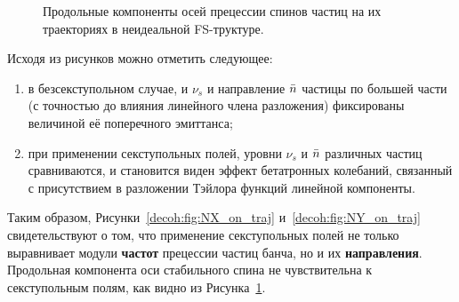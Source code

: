\begin{figure}[!h]
	\centering
	\hfill
	\hfill
	\caption{Продольные компоненты осей прецессии спинов частиц на их траекториях в неидеальной FS-труктуре.\label{decoh:fig:NZ_on_traj}}
\end{figure}

Исходя из рисунков можно отметить следующее:
\begin{enumerate}
	\item в безсекступольном случае, и $\nu_s$ и направление $\bar n$ частицы по большей части (с точностью до влияния линейного члена разложения) фиксированы величиной её поперечного эмиттанса;
	\item при применении секступольных полей, уровни $\nu_s$ и $\bar n$ различных частиц сравниваются, 
	и становится виден эффект бетатронных колебаний, связанный с присутствием в разложении Тэйлора функций линейной компоненты.
\end{enumerate}
Таким образом, Рисунки~\ref{decoh:fig:NX_on_traj} и~\ref{decoh:fig:NY_on_traj} свидетельствуют о том, что применение секступольных полей не только выравнивает модули \textbf{частот} прецессии частиц банча, но и их \textbf{направления}. Продольная компонента оси стабильного спина не чувствительна к секступольным полям, как видно из Рисунка~\ref{decoh:fig:NZ_on_traj}.

